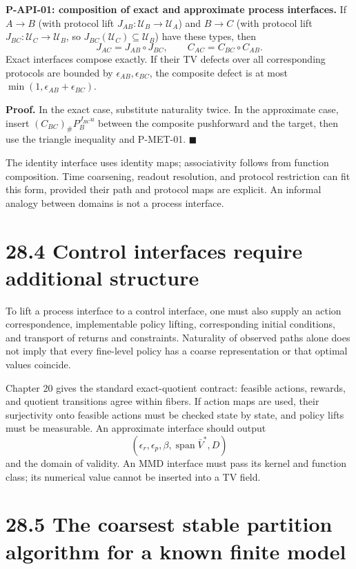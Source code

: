 \documentclass[
  english,
  11pt,
  oneside]{book}
\begin{document}
\textbf{P-API-01: composition of exact and approximate process interfaces.} If \(A\to B\) (with protocol lift \(J_{AB}:\mathcal U_B\to\mathcal U_A\)) and \(B\to C\) (with protocol lift \(J_{BC}:\mathcal U_C\to\mathcal U_B\), so \(J_{BC}(\mathcal U_C)\subseteq\mathcal U_B\)) have these types, then \[J_{AC}=J_{AB}\circ J_{BC},\qquad
C_{AC}=C_{BC}\circ C_{AB}.\] Exact interfaces compose exactly. If their TV defects over all corresponding protocols are bounded by \(\epsilon_{AB},\epsilon_{BC}\), the composite defect is at most \(\min(1,\epsilon_{AB}+\epsilon_{BC})\).

\textbf{Proof.} In the exact case, substitute naturality twice. In the approximate case, insert \((C_{BC})_\#P_B^{J_{BC}u}\) between the composite pushforward and the target, then use the triangle inequality and P-MET-01. \(\blacksquare\)

The identity interface uses identity maps; associativity follows from function composition. Time coarsening, readout resolution, and protocol restriction can fit this form, provided their path and protocol maps are explicit. An informal analogy between domains is not a process interface.

\section{28.4 Control interfaces require additional structure}\label{control-interfaces-require-additional-structure}

To lift a process interface to a control interface, one must also supply an action correspondence, implementable policy lifting, corresponding initial conditions, and transport of returns and constraints. Naturality of observed paths alone does not imply that every fine-level policy has a coarse representation or that optimal values coincide.

Chapter 20 gives the standard exact-quotient contract: feasible actions, rewards, and quotient transitions agree within fibers. If action maps are used, their surjectivity onto feasible actions must be checked state by state, and policy lifts must be measurable. An approximate interface should output \[(\epsilon_r,\epsilon_p,\beta,\operatorname{span}\bar V^*,D)\] and the domain of validity. An MMD interface must pass its kernel and function class; its numerical value cannot be inserted into a TV field.

\section{28.5 The coarsest stable partition algorithm for a known finite model}\label{the-coarsest-stable-partition-algorithm-for-a-known-finite-model}
\end{document}
